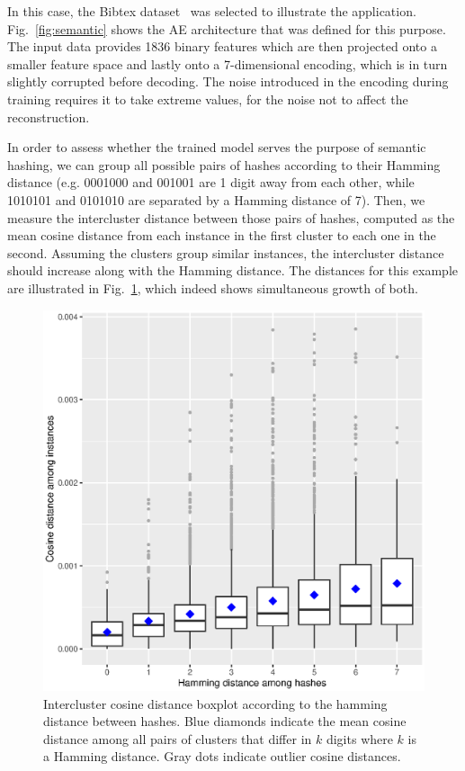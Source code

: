 In this case, the Bibtex dataset~ was selected to illustrate the application. Fig.~\ref{fig:semantic} shows the AE architecture that was defined for this purpose. The input data provides 1836 binary features which are then projected onto a smaller feature space and lastly onto a 7-dimensional encoding, which is in turn slightly corrupted before decoding. The noise introduced in the encoding during training requires it to take extreme values, for the noise not to affect the reconstruction.

In order to assess whether the trained model serves the purpose of semantic hashing, we can group all possible pairs of hashes according to their Hamming distance (e.g. 0001000 and 001001 are 1 digit away from each other, while 1010101 and 0101010 are separated by a Hamming distance of 7). Then, we measure the intercluster distance between those pairs of hashes, computed as the mean cosine distance from each instance in the first cluster to each one in the second. Assuming the clusters group similar instances, the intercluster distance should increase along with the Hamming distance. The distances for this example are illustrated in Fig.~\ref{fig:hashingplot}, which indeed shows simultaneous growth of both.

\begin{figure}[ht!]
    \centering
    \includegraphics[width=\linewidth]{hashing_intercluster.eps}
    \caption{\label{fig:hashingplot}Intercluster cosine distance boxplot according to the hamming distance between hashes. Blue diamonds indicate the mean cosine distance among all pairs of clusters that differ in $k$ digits where $k$ is a Hamming distance. Gray dots indicate outlier cosine distances.}
\end{figure}

